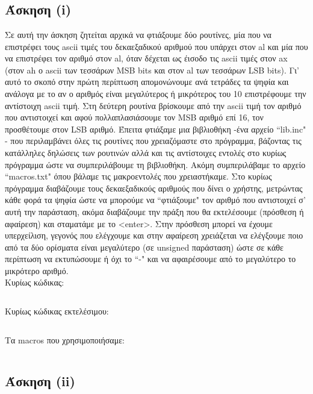 \documentclass[a4paper,10pt]{article} \usepackage{anysize}
\begin{document}


\section*{} 
\subsection*{Άσκηση (i)}
Σε αυτή την άσκηση ζητείται αρχικά να φτιάξουμε δύο ρουτίνες, μία που να
επιστρέφει τους ascii τιμές του δεκαεξαδικού αριθμού που υπάρχει στον al και
μία που να επιστρέφει τον αριθμό στον al, όταν δέχεται ως έισοδο τις ascii
τιμές στον ax (στον ah ο ascii των τεσσάρων MSB bits και στον al των τεσσάρων
LSB bits). Γι' αυτό το σκοπό στην πρώτη περίπτωση απομονώνουμε ανά τετράδες τα
ψηφία και ανάλογα με το αν ο αριθμός είναι μεγαλύτερος ή μικρότερος του 10
επιστρέφουμε την αντίστοιχη ascii τιμή. Στη δεύτερη ρουτίνα βρίσκουμε από την
ascii τιμή τον αριθμό που αντιστοιχεί και αφού πολλαπλασιάσουμε τον MSB αριθμό
επί 16, τον προσθέτουμε στον LSB αριθμό. Έπειτα φτιάξαμε μια βιβλιοθήκη -ένα
αρχείο ``lib.inc" - που περιλαμβάνει όλες τις ρουτίνες που χρειαζόμαστε στο
πρόγραμμα, βάζοντας τις κατάλληλες δηλώσεις των ρουτινών αλλά και τις
αντίστοιχες εντολές στο κυρίως πρόγραμμα ώστε να συμπεριλάβουμε τη βιβλιοθήκη.
Ακόμη συμπεριλάβαμε το αρχείο ``macros.txt" όπου βάλαμε τις μακροεντολές
που χρειαστήκαμε.  Στο κυρίως πρόγραμμα διαβάζουμε τους δεκαεξαδικούς αριθμούς
που δίνει ο χρήστης, μετρώντας κάθε φορά τα ψηφία ώστε να μπορούμε να
``φτιάξουμε" τον αριθμό που αντιστοιχεί σ' αυτή την παράσταση, ακόμα διαβάζουμε
την πράξη που θα εκτελέσουμε (πρόσθεση ή αφαίρεση) και σταματάμε με το
<enter>. Στην πρόσθεση μπορεί να έχουμε υπερχείλιση, γεγονός που ελέγχουμε και
στην αφαίρεση χρειάζεται να ελέγξουμε ποιο από τα δύο ορίσματα είναι
μεγαλύτερο (σε unsigned παράσταση) ώστε σε κάθε περίπτωση να εκτυπώσουμε ή όχι
το ``-" και να αφαιρέσουμε από το μεγαλύτερο το μικρότερο αριθμό.\\[0.5cm]

\noindent Κυρίως κώδικας:
\inputminted[linenos,obeytabs,fontsize=\footnotesize]{nasm}{files/lib.inc}
\noindent Κυρίως κώδικας εκτελέσιμου:
\inputminted[linenos,obeytabs,fontsize=\footnotesize]{nasm}{files/1.asm}
\noindent Τα macros που χρησιμοποιήσαμε:
\inputminted[linenos,obeytabs,fontsize=\footnotesize]{nasm}{files/1.txt}
\subsection*{Άσκηση (ii)}
\end{document}
